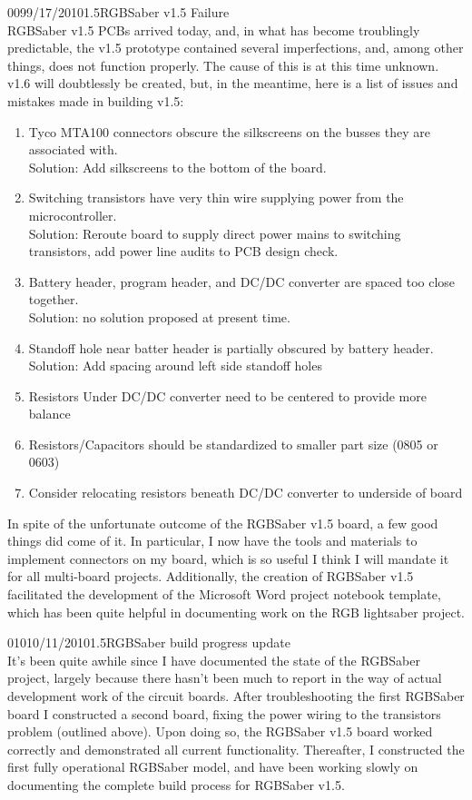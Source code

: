 \documentclass[12pt,letterpaper,onecolumn]{article}
\begin{document}
\begin{nbentry}{009}{9/17/2010}{1.5}{RGBSaber v1.5 Failure}
\\	RGBSaber v1.5 PCBs arrived today, and, in what has become troublingly predictable, the v1.5 prototype contained several imperfections, and, among other things, does not function properly. The cause of this is at this time unknown. v1.6 will doubtlessly be created, but, in the meantime, here is a list of issues and mistakes made in building v1.5:
\begin{enumerate}
\item Tyco MTA100 connectors obscure the silkscreens on the busses they are associated with. \\
	Solution: Add silkscreens to the bottom of the board.
\item Switching transistors have very thin wire supplying power from the microcontroller. \\
	Solution: Reroute board to supply direct power mains to switching transistors, add power line audits to PCB design check.
\item Battery header, program header, and DC/DC converter are spaced too close together. \\
	Solution: no solution proposed at present time.
\item Standoff hole near batter header is partially obscured by battery header. \\
	Solution: Add spacing around left side standoff holes
\item Resistors Under DC/DC converter need to be centered to provide more balance
\item Resistors/Capacitors should be standardized to smaller part size (0805 or 0603)
\item Consider relocating resistors beneath DC/DC converter to underside of board
\end{enumerate}
	In spite of the unfortunate outcome of the RGBSaber v1.5 board, a few good things did come of it. In particular, I now have the tools and materials to implement connectors on my board, which is so useful I think I will mandate it for all multi-board projects. Additionally, the creation of RGBSaber v1.5 facilitated the development of the Microsoft Word project notebook template, which has been quite helpful in documenting work on the RGB lightsaber project.
\end{nbentry}

\begin{nbentry}{010}{10/11/2010}{1.5}{RGBSaber build progress update}
\\	It's been quite awhile since I have documented the state of the RGBSaber project, largely because there hasn't been much to report in the way of actual development work of the circuit boards. After troubleshooting the first RGBSaber board I constructed a second board, fixing the power wiring to the transistors problem (outlined above). Upon doing so, the RGBSaber v1.5 board worked correctly and demonstrated all current functionality. Thereafter, I constructed the first fully operational RGBSaber model, and have been working slowly on documenting the complete build process for RGBSaber v1.5.
\end{nbentry}
\end{document}
